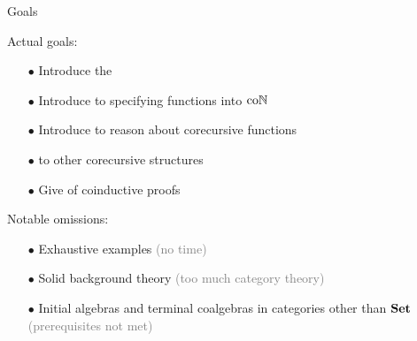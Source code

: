 \begin{frame}{Goals}
  
  \par Actual goals:
  \begin{itemize}[nosep]
    \item[$\bullet$] Introduce the 
    \item[$\bullet$] Introduce  to specifying functions into $\mathrm{co}\mathbb{N}$
    \item[$\bullet$] Introduce  to reason about corecursive functions
    \item[$\bullet$]  to other corecursive structures
    \item[$\bullet$] Give  of coinductive proofs
  \end{itemize}

  \vspace{\baselineskip}

  \par Notable omissions:
  \begin{itemize}[nosep]
    \item[$\bullet$] Exhaustive examples \textcolor{gray}{(no time)}
    \item[$\bullet$] Solid background theory \textcolor{gray}{(too much category theory)}
    \item[$\bullet$] Initial algebras and terminal coalgebras in categories other than $\operatorname{\mathbf{Set}}$ \textcolor{gray}{(prerequisites not met)}
  \end{itemize}

\end{frame}
